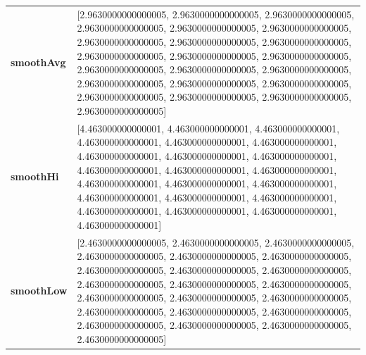 		\begin{table}[H]
			\centering
			\begin{tabularx}{\textwidth}{lX}
		\textbf{smoothAvg}&  [2.9630000000000005, 2.9630000000000005, 2.9630000000000005, 2.9630000000000005, 2.9630000000000005, 2.9630000000000005, 2.9630000000000005, 2.9630000000000005, 2.9630000000000005, 2.9630000000000005, 2.9630000000000005, 2.9630000000000005, 2.9630000000000005, 2.9630000000000005, 2.9630000000000005, 2.9630000000000005, 2.9630000000000005, 2.9630000000000005, 2.9630000000000005, 2.9630000000000005, 2.9630000000000005, 2.9630000000000005] \\
		\textbf{smoothHi}& [4.463000000000001, 4.463000000000001, 4.463000000000001, 4.463000000000001, 4.463000000000001, 4.463000000000001, 4.463000000000001, 4.463000000000001, 4.463000000000001, 4.463000000000001, 4.463000000000001, 4.463000000000001, 4.463000000000001, 4.463000000000001, 4.463000000000001, 4.463000000000001, 4.463000000000001, 4.463000000000001, 4.463000000000001, 4.463000000000001, 4.463000000000001, 4.463000000000001] \\
		\textbf{smoothLow} &[2.4630000000000005, 2.4630000000000005, 2.4630000000000005, 2.4630000000000005, 2.4630000000000005, 2.4630000000000005, 2.4630000000000005, 2.4630000000000005, 2.4630000000000005, 2.4630000000000005, 2.4630000000000005, 2.4630000000000005, 2.4630000000000005, 2.4630000000000005, 2.4630000000000005, 2.4630000000000005, 2.4630000000000005, 2.4630000000000005, 2.4630000000000005, 2.4630000000000005, 2.4630000000000005, 2.4630000000000005] \\
		
		
	\end{tabularx} 
\end{table}
